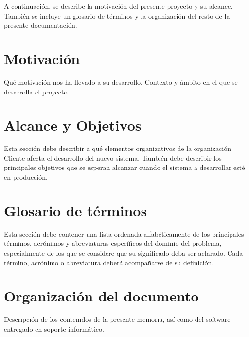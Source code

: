 

A continuación, se describe la motivación del presente proyecto y su alcance. También se incluye un glosario de términos y la organización del resto de la presente documentación.

\section{Motivación}
Qué motivación nos ha llevado a su desarrollo. Contexto y ámbito en el que se desarrolla el proyecto.

\section{Alcance y Objetivos} 
Esta sección debe describir a qué elementos organizativos de la organización Cliente afecta el desarrollo del nuevo sistema. También debe describir los principales objetivos que se esperan alcanzar cuando el sistema a desarrollar esté en producción.



\section{Glosario de términos} 
Esta sección debe contener una lista ordenada alfabéticamente de los principales términos, acrónimos y abreviaturas específicos del dominio del problema, especialmente de los que se considere que su significado deba ser aclarado. Cada término, acrónimo o abreviatura deberá acompañarse de su definición.

\section{Organización del documento}
Descripción de los contenidos de la presente memoria, así como del software entregado en soporte informático.




